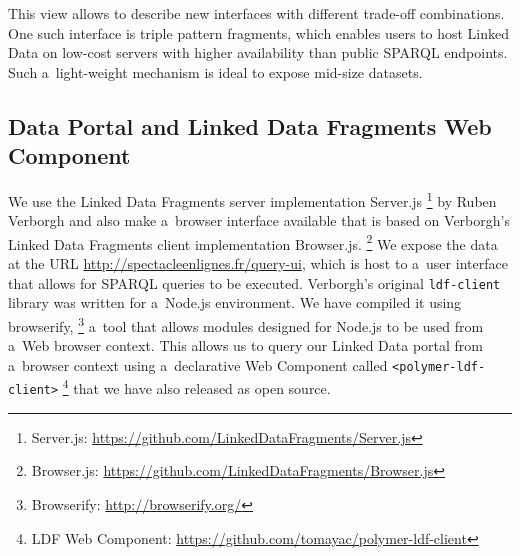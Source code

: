 \documentclass[runningheads,a4paper]{llncs}
\begin{document}
This view allows to describe new interfaces with different trade-off combinations.
One such interface is triple pattern fragments, %
which enables users to host Linked Data on low-cost servers with higher availability
than public SPARQL endpoints. %
Such a~light-weight mechanism is ideal to expose mid-size datasets.

\subsection{Data Portal and Linked Data Fragments Web Component}

We use the Linked Data Fragments server implementation Server.js%
\footnote{Server.js: \url{https://github.com/LinkedDataFragments/Server.js}} by Ruben Verborgh
and also make a~browser interface available that is based on Verborgh's Linked Data Fragments
client implementation Browser.js.%
\footnote{Browser.js: \url{https://github.com/LinkedDataFragments/Browser.js}}
We expose the data at the URL \url{http://spectacleenlignes.fr/query-ui},
which is host to a~user interface that allows for SPARQL queries to be executed.
Verborgh's original \texttt{ldf-client} library was written for a~Node.js environment.
We have compiled it using browserify,%
\footnote{Browserify: \url{http://browserify.org/}}
a~tool that allows modules designed for Node.js to be used from a~Web browser context.
This allows us to query our Linked Data portal from a~browser context using a~declarative Web Component
called \texttt{<polymer-ldf-client>}%
\footnote{LDF Web Component:
\url{https://github.com/tomayac/polymer-ldf-client}}
that we have also released as open source.
\end{document}
